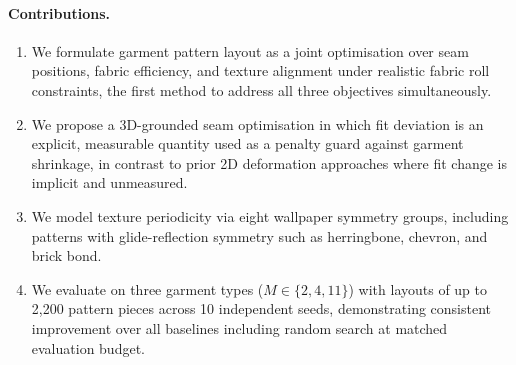 \paragraph{Contributions.}
\begin{enumerate}
    \item We formulate garment pattern layout as a joint optimisation over
          seam positions, fabric efficiency, and texture alignment under
          realistic fabric roll constraints, the first method to address
          all three objectives simultaneously.

    \item We propose a 3D-grounded seam optimisation in which fit deviation
          is an explicit, measurable quantity used as a penalty guard
          against garment shrinkage, in contrast to prior 2D deformation
          approaches where fit change is implicit and unmeasured.

    \item We model texture periodicity via eight wallpaper symmetry groups,
          including patterns with glide-reflection symmetry such as
          herringbone, chevron, and brick bond.

    \item We evaluate on three garment types ($M \in \{2, 4, 11\}$) with
          layouts of up to 2{,}200 pattern pieces across 10 independent
          seeds, demonstrating consistent improvement over all baselines
          including random search at matched evaluation budget.
\end{enumerate}

